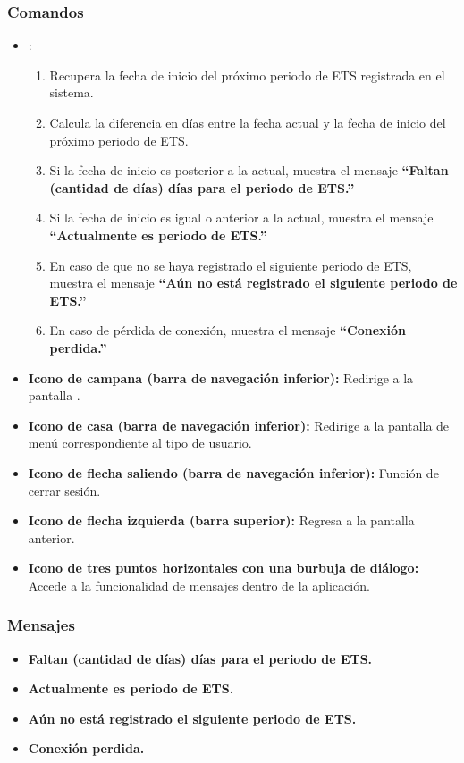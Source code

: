 \subsubsection{Comandos}
\begin{itemize}
	\item {}:
	\begin{enumerate}
		\item Recupera la fecha de inicio del próximo periodo de ETS registrada en el sistema.
		\item Calcula la diferencia en días entre la fecha actual y la fecha de inicio del próximo periodo de ETS.
		\item Si la fecha de inicio es posterior a la actual, muestra el mensaje \textbf{ ``Faltan (cantidad de días) días para el periodo de ETS.''}
		\item Si la fecha de inicio es igual o anterior a la actual, muestra el mensaje \textbf{ ``Actualmente es periodo de ETS.''}
		\item En caso de que no se haya registrado el siguiente periodo de ETS, muestra el mensaje \textbf{ ``Aún no está registrado el siguiente periodo de ETS.''}
		\item En caso de pérdida de conexión, muestra el mensaje \textbf{ ``Conexión perdida.''}
	\end{enumerate}
	\item \textbf{Icono de campana (barra de navegación inferior):} Redirige a la pantalla .
	\item \textbf{Icono de casa (barra de navegación inferior):} Redirige a la pantalla de menú correspondiente al tipo de usuario.
	\item \textbf{Icono de flecha saliendo (barra de navegación inferior):} Función de cerrar sesión.
	\item \textbf{Icono de flecha izquierda (barra superior):} Regresa a la pantalla anterior.
	\item \textbf{Icono de tres puntos horizontales con una burbuja de diálogo:} Accede a la funcionalidad de mensajes dentro de la aplicación.
\end{itemize}

\subsubsection{Mensajes}

\begin{itemize}
	\item \textbf{ Faltan (cantidad de días) días para el periodo de ETS.}
	\item \textbf{ Actualmente es periodo de ETS.}
	\item \textbf{ Aún no está registrado el siguiente periodo de ETS.}
	\item \textbf{ Conexión perdida.}
\end{itemize}

